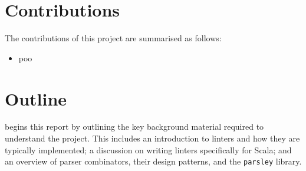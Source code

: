 \documentclass[../../main.tex]{subfiles}
\begin{document}



\section*{Contributions}
The contributions of this project are summarised as follows:
\begin{itemize}
  \item poo
\end{itemize}

\section*{Outline}
 begins this report by outlining the key background material required to understand the project.
This includes an introduction to linters and how they are typically implemented; a discussion on writing linters specifically for Scala; and an overview of parser combinators, their design patterns, and the \texttt{parsley} library.
\end{document}
